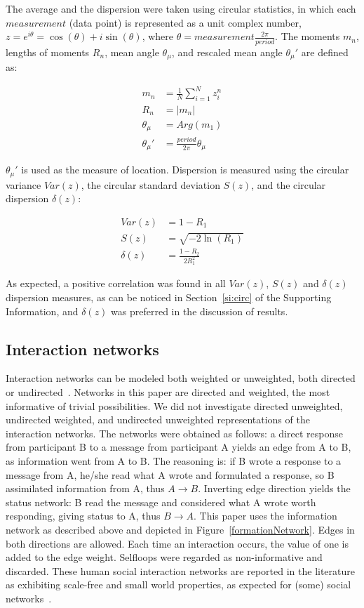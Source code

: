 \documentclass[%
	aip,
	jmp,%
	amsmath,amssymb,
	reprint,%
]{revtex4-1}
\begin{document}
The average and the dispersion were taken using circular statistics, in which each $measurement$ (data point) is represented as a unit complex number, $z=e^{i\theta}=\cos(\theta)+i\sin(\theta)$, where $\theta=measurement\frac{2\pi}{period}$. The moments $m_n$, lengths of moments $R_n$, mean angle $\theta_\mu$, and rescaled mean angle $\theta_\mu'$ are defined as:

\begin{align}\label{eq:cmom}
	m_n&=\frac{1}{N}\sum_{i=1}^N z_i^n \nonumber\\
	R_n&=|m_n|\\
	\theta_\mu&=Arg(m_1) \nonumber \\
	\theta_\mu'&=\frac{period}{2\pi} \theta_\mu \nonumber
\end{align}

$\theta_\mu'$ is used as the measure of location. Dispersion is measured using the circular variance $Var(z)$, the circular standard deviation $S(z)$, and the circular dispersion $\delta(z)$:

\begin{align}\label{eq:cmd}
	Var(z)&=1 - R_1 \nonumber\\
	S(z)&= \sqrt{-2\ln(R_1)}\\
	\delta(z)&=\frac{1-R_2}{2 R_1^2} \nonumber
\end{align}

\noindent As expected, a positive correlation was found in all $Var(z)$, $S(z)$ and $\delta(z)$ dispersion measures, as can be noticed in Section~\ref{si:circ} of the Supporting Information, and $\delta(z)$ was preferred in the discussion of results.

\subsection{Interaction networks}\label{intNet}
Interaction networks can be modeled both weighted or unweighted, both directed or undirected~\cite{bird,newmanCommunityDirected,newmanCommunity2013}.
Networks in this paper are directed and weighted, the most informative of trivial possibilities. We did not investigate directed unweighted, undirected weighted, and undirected unweighted representations of the interaction networks. 
The networks were obtained as follows: a direct response from participant B to a message from participant A yields an edge from A to B, as information went from A to B. The reasoning is: if B wrote a response to a message from A, he/she read what A wrote and formulated a response, so B assimilated information from A, thus $A \rightarrow B$. Inverting edge direction yields the status network: B read the message and considered what A wrote worth responding, giving status to A, thus $B\rightarrow A$. This paper uses the information network as described above and depicted in Figure~\ref{formationNetwork}. Edges in both directions are allowed. Each time an interaction occurs, the value of one is added to the edge weight. Selfloops were regarded as non-informative and discarded. These human social interaction networks are reported in the literature as exhibiting scale-free and small world properties, as expected for (some) social networks~\cite{bird,newmanBook}.
\end{document}
